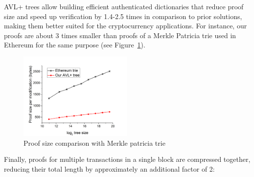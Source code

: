 AVL+ trees allow building efficient authenticated dictionaries that reduce proof size and speed up verification by 1.4-2.5 times in comparison to prior solutions, making them better suited for the cryptocurrency applications.
For instance, our proofs are about 3 times smaller than proofs of a Merkle Patricia trie used in Ethereum for the same purpose (see Figure~\ref{fig:proofSize}).

\begin{figure}[H]
    \centering
    \includegraphics[width=0.5\textwidth]{img/proofSize.png}
    \caption{Proof size comparison with Merkle patricia trie
    \label{fig:proofSize} }
\end{figure}

Finally, proofs for multiple transactions in a single block are compressed together, reducing their total length
by approximately an additional factor of 2:

